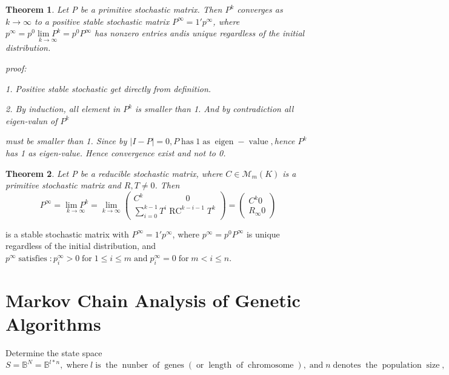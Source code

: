 \documentclass{article}
\newcommand{\tmop}[1]{\ensuremath{\operatorname{#1}}}
\newtheorem{theorem}{Theorem}
\begin{document}
\begin{theorem}
  Let P be a primitive stochastic matrix. Then $P^k$ converges as $k
  \rightarrow \infty$ to a positive stable stochastic matrix $P^{\infty} = 1'
  p^{\infty}$, where $p^{\infty} = p^0 \underset{k \rightarrow \infty}{\lim
  P^k} = p^0 P^{\infty}$ has nonzero entries andis unique regardless of the
  initial distribution.
  
  proof:
  
  1. Positive stable stochastic get directly from definition.
  
  2. By induction, all element in $P^k$ is smaller than 1. And by
  contradiction all eigen-valun of $P^k$
  
  must be smaller than 1. Since by $| I - P | = 0, P \tmop{has} 1 \tmop{as}
  \tmop{eigen} - \tmop{value},$hence $P^k$has 1 as eigen-value. Hence
  convergence exist and not to 0.
\end{theorem}

\begin{theorem}
  Let P be a reducible stochastic matrix, where $C \in \mathcal{M}_m (K)$ is a
  primitive stochastic matrix and $R, T \neq 0$. Then
  \begin{equation}
    P^{\infty} = \underset{k \rightarrow \infty}{\lim P^k} = \underset{k
    \rightarrow \infty}{\lim} \left(\begin{array}{c}
      C^k \hspace{5em} 0\\
      \sum^{k - 1}_{i = 0} T^i \tmop{RC}^{k - i - 1} T^k
    \end{array}\right) = \left(\begin{array}{c}
      C^k 0\\
      R_{\infty} 0
    \end{array}\right)
  \end{equation}
\end{theorem}

is a stable stochastic matrix with $P^{\infty} = 1' p^{\infty}$, where
$p^{\infty} = p^0 P^{\infty}$ is unique regardless of the initial
distribution, and $p^{\infty} \tmop{satisfies} : p_i^{\infty} > 0 \tmop{for} 1
\leqslant i \leqslant m \tmop{and} p_i^{\infty} = 0 \tmop{for} m < i \leqslant
n$.

\section{Markov Chain Analysis of Genetic Algorithms}

Determine the state space $S = \mathbb{B}^N =\mathbb{B}^{l \ast n},
\tmop{where} l \tmop{is} \tmop{the} \tmop{nunber} \tmop{of} \tmop{genes}
(\tmop{or} \tmop{length} \tmop{of} \tmop{chromosome}), \tmop{and} n
\tmop{denotes} \tmop{the} \tmop{population} \tmop{size},$
\end{document}
